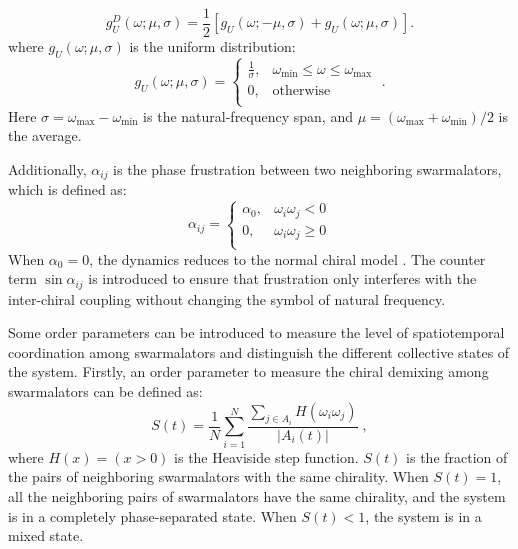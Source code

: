 \documentclass{article}
\begin{document}
\begin{equation}
    g_U^{D}\left( \omega ;\mu,\sigma\right) 
    =\frac{1}{2}\left [
    g_U\left( \omega ;-\mu,\sigma\right) + 
    g_U\left( \omega ; \mu,\sigma\right) \right ].
    \label{eq:uniform2}
\end{equation}
where $g_U\left( \omega ;\mu ,\sigma \right)$ is the uniform distribution:
\begin{equation}
    g_U\left( \omega ;\mu ,\sigma \right) =\begin{cases}
	\frac{1}{\sigma},&		\omega _{\min}\leqslant \omega \leqslant \omega _{\max}\\
	0,&		\mathrm{otherwise}\\
\end{cases}\;.
\label{eq:uniform}
\end{equation}
Here $\sigma = \omega_{\max}-\omega _{\min}$ is the natural-frequency span, and $\mu = (\omega_{\max}+\omega _{\min})/2$ is the average.

Additionally, $\alpha_{ij}$ is the phase frustration between two neighboring swarmalators, which is defined as:
\begin{equation}
    \alpha _{ij}=\begin{cases}
        \alpha _0,&		\omega _i\omega _j<0\\
        0,&		\omega _i\omega _j\geqslant 0\\
    \end{cases}
\end{equation}
When $\alpha_0=0$, the dynamics reduces to the normal chiral model \cite{LU2025115794}. 
The counter term $\sin\alpha_{ij}$ is introduced to ensure that frustration only interferes with the inter-chiral coupling without changing the symbol of natural frequency. 

Some order parameters can be introduced to measure the level of spatiotemporal coordination among swarmalators and distinguish the different collective states of the system. 
Firstly, an order parameter to measure the chiral demixing among swarmalators can be defined as:
\begin{equation}
    S\left( t \right) =\frac{1}{N}\sum_{i=1}^N{\frac{\sum_{j\in A_i}{H\left( \omega _i\omega _j \right)}}{\left| A_i\left( t \right) \right|}}\;,
\end{equation}
where $H\left( x \right) =\left( x>0 \right)$ is the Heaviside step function. $S\left( t \right)$ is the fraction of the pairs of neighboring swarmalators with the same chirality. When $S\left( t \right)=1$, all the neighboring pairs of swarmalators have the same chirality, and the system is in a completely phase-separated state. When $S\left( t \right)< 1$, the system is in a mixed state.
\end{document}
